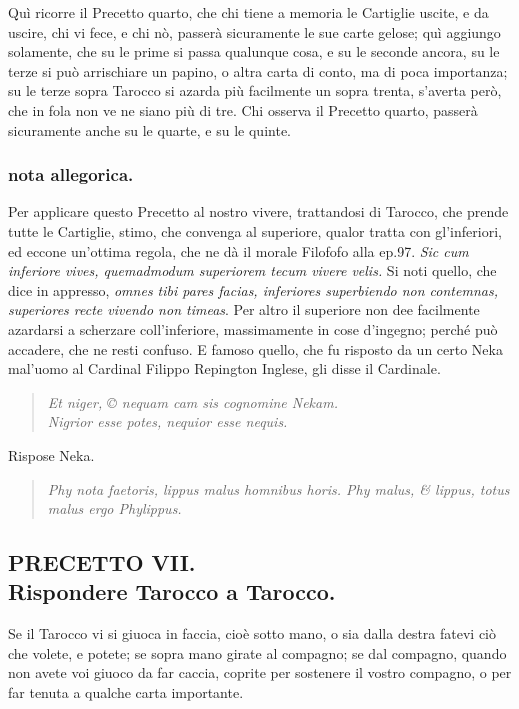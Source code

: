 \documentclass[11pt,a6paper]{article}
\newcommand{\literaryquote}[1]{%
\kern -6pt  \begin{verse}
    {\footnotesize \it #1}
  \end{verse}\kern -2pt%
}
\begin{document}
Quì ricorre il Precetto quarto, che chi
tiene a memoria le Cartiglie uscite,
e da uscire, chi vi fece, e chi nò,
passerà sicuramente le sue carte gelose; quì
aggiungo solamente, che su le prime si passa
qualunque cosa, e su le seconde ancora, su
le terze si può arrischiare un papino, o altra
carta di conto, ma di poca importanza; su le
terze sopra Tarocco si azarda più facilmente
un sopra trenta, s'averta però, che in fola
non ve ne siano più di tre. Chi osserva il
Precetto quarto, passerà sicuramente anche su le
quarte, e su le quinte.

\subsubsection{nota allegorica.}
{\footnotesize
Per applicare questo Precetto al nostro vivere,
trattandosi di Tarocco, che prende tutte le Cartiglie,
stimo, che convenga al superiore, qualor tratta
con gl'inferiori, ed eccone un'ottima regola,
che ne dà il morale Filofofo alla ep.97. \textit{
 Sic cum inferiore vives, quemadmodum superiorem
 tecum vivere velis.} Si noti quello, che dice
in appresso, \textit{
omnes tibi pares facias, inferiores superbiendo non
contemnas, superiores recte vivendo non timeas}.
Per altro il superiore non dee facilmente azardarsi
a scherzare coll'inferiore, massimamente in cose
d'ingegno; perché può accadere, che ne resti
confuso. E famoso quello, che fu risposto da un certo
Neka mal'uomo al Cardinal Filippo Repington
Inglese, gli disse il Cardinale.

\literaryquote{
 Et niger, © nequam cam sis cognomine Nekam.\\
 Nigrior esse potes, nequior esse nequis.}

Rispose Neka.

\literaryquote{Phy nota faetoris, lippus malus homnibus horis.
Phy malus, \& lippus, totus malus ergo Phylippus.}
}
\subsection{PRECETTO VII.\\
 \footnotesize Rispondere Tarocco a Tarocco.}

Se il Tarocco vi si giuoca in faccia, cioè
sotto mano, o sia dalla destra fatevi ciò
che volete, e potete; se sopra mano girate al
compagno; se dal compagno, quando non
avete voi giuoco da far caccia, coprite per
sostenere il vostro compagno, o per far tenuta
a qualche carta importante.
\end{document}
